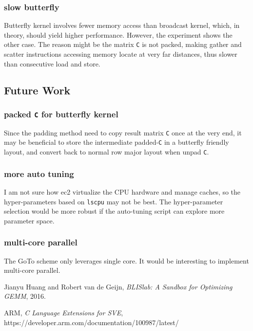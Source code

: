\documentclass[12pt]{article}
\begin{document}
\subsubsection{slow butterfly}
Butterfly kernel involves fewer memory access 
than broadcast kernel, which, in theory, should yield higher performance.
However, the experiment shows the other case.
The reason might be the matrix \texttt{C} is not packed,
making gather and scatter instructions accessing memory locate at very far distances,
thus slower than consecutive load and store.

\subsection{Future Work}
\subsubsection{packed \texttt{C} for butterfly kernel}
Since the padding method need to copy result matrix \texttt{C} once at the very end, 
it may be beneficial to store the intermediate padded-\texttt{C} in 
a butterfly friendly layout, and convert back to normal row major layout when unpad \texttt{C}.

\subsubsection{more auto tuning}
I am not sure how ec2 virtualize the CPU hardware and manage caches,
so the hyper-parameters based on \texttt{lscpu} may not be best.
The hyper-parameter selection would be more robust
if the auto-tuning script can explore more parameter space.

\subsubsection{multi-core parallel}
The GoTo scheme only leverages single core. 
It would be interesting to implement multi-core parallel.

\begin{thebibliography}{99}
Jianyu Huang and Robert van de Geijn, \textit{BLISlab: A Sandbox for Optimizing GEMM}, 2016.
 
ARM, \textit{C Language Extensions for SVE}, https://developer.arm.com/documentation/100987/latest/
\end{thebibliography}
    
\end{document}
